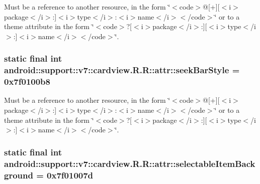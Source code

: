 Must be a reference to another resource, in the form \char`\"{}$<$code$>$@\mbox{[}+\mbox{]}\mbox{[}$<$i$>$package$<$/i$>$:\mbox{]}$<$i$>$type$<$/i$>$:$<$i$>$name$<$/i$>$$<$/code$>$\char`\"{} or to a theme attribute in the form \char`\"{}$<$code$>$?\mbox{[}$<$i$>$package$<$/i$>$:\mbox{]}\mbox{[}$<$i$>$type$<$/i$>$:\mbox{]}$<$i$>$name$<$/i$>$$<$/code$>$\char`\"{}. \hypertarget{classandroid_1_1support_1_1v7_1_1cardview_1_1_r_1_1attr_056343741e780cf8a84beeb52da6239d}{
\subsubsection[{seekBarStyle}]{\setlength{\rightskip}{0pt plus 5cm}static final int android::support::v7::cardview.R.R::attr::seekBarStyle = 0x7f0100b8}}
\label{classandroid_1_1support_1_1v7_1_1cardview_1_1_r_1_1attr_056343741e780cf8a84beeb52da6239d}


Must be a reference to another resource, in the form \char`\"{}$<$code$>$@\mbox{[}+\mbox{]}\mbox{[}$<$i$>$package$<$/i$>$:\mbox{]}$<$i$>$type$<$/i$>$:$<$i$>$name$<$/i$>$$<$/code$>$\char`\"{} or to a theme attribute in the form \char`\"{}$<$code$>$?\mbox{[}$<$i$>$package$<$/i$>$:\mbox{]}\mbox{[}$<$i$>$type$<$/i$>$:\mbox{]}$<$i$>$name$<$/i$>$$<$/code$>$\char`\"{}. \hypertarget{classandroid_1_1support_1_1v7_1_1cardview_1_1_r_1_1attr_942d899c628a2c3a0d3036b582318c1d}{
\subsubsection[{selectableItemBackground}]{\setlength{\rightskip}{0pt plus 5cm}static final int android::support::v7::cardview.R.R::attr::selectableItemBackground = 0x7f01007d}}
\label{classandroid_1_1support_1_1v7_1_1cardview_1_1_r_1_1attr_942d899c628a2c3a0d3036b582318c1d}


